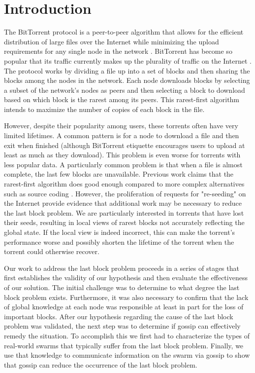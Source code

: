 \section{Introduction}

The BitTorrent protocol is a peer-to-peer algorithm that allows for
the efficient distribution of large files over the Internet while
minimizing the upload requirements for any single node in the network
\cite{bep003}. BitTorrent has become so popular that its traffic currently
makes up the plurality of traffic on the Internet \cite{istudy08}. The
protocol works by dividing a file up into a set of blocks and then
sharing the blocks among the nodes in the network. Each node downloads
blocks by selecting a subset of the network's nodes as peers and then
selecting a block to download based on which block is the rarest among
its peers. This rarest-first algorithm intends to maximize the number
of copies of each block in the file.


However, despite their popularity among users, these torrents often have
very limited lifetimes. A common pattern is for a node to download a file
and then exit when finished (although BitTorrent etiquette encourages users to upload at
least as much as they download). This problem is even worse for torrents
with less popular data. A particularly common problem is that when a file
is almost complete, the last few blocks are unavailable. Previous work
claims that the rarest-first algorithm does good enough compared to
more complex alternatives such as source coding \cite{legout:1}. However,
the proliferation of requests for "re-seeding" on the Internet provide
evidence that additional work may be necessary to reduce the last block
problem. We are particularly interested in torrents that have lost
their seeds, resulting in local views of rarest blocks not accurately
reflecting the global state. If the local view is indeed incorrect,
this can make the torrent's performance worse and possibly shorten the
lifetime of the torrent when the torrent could otherwise recover.


Our work to address the last block problem proceeds in a series of stages
that first establishes the validity of our hypothesis and then evaluate
the effectiveness of our solution. The initial challenge was to determine
to what degree the last block problem exists. Furthermore,  it was also
necessary to confirm that the lack of global knowledge at each node was
responsible at least in part for the loss of important blocks. After our
hypothesis regarding the cause of the last block problem was validated,
the next step was to determine if gossip can effectively
remedy the situation. To accomplish this we first had to characterize
the types of real-world swarms that typically suffer from the last block
problem. Finally, we use that knowledge to communicate information on
the swarm via gossip to show that gossip can reduce the
occurrence of the last block problem.


